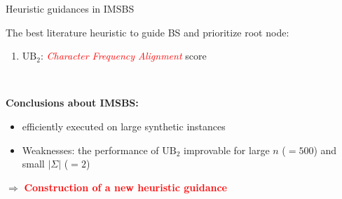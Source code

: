 \documentclass{beamer}
\begin{document}
\begin{frame}{Heuristic guidances in IMSBS}
    
    The best literature heuristic to guide BS and prioritize root node: \vspace{0.2cm}
        \begin{enumerate}
    	  	\item   $\textrm{UB}_2$: \textcolor{red}{\textit{Character Frequency Alignment}} score
    \end{enumerate} \\ \vspace{0.5cm}
    
\textbf{Conclusions about IMSBS:}
    \begin{itemize}
    	\item efficiently executed on large synthetic instances
    	\item {Weaknesses}: the performance of $\textrm{UB}_2$ improvable for  large $n$ ($=500$) and small $|\Sigma|$ ($=2$) 
    \end{itemize} \vspace{0.7cm}
    $\Rightarrow$ \textcolor{red}{\textbf{Construction of a new heuristic guidance}}
\end{frame}
\end{document}
